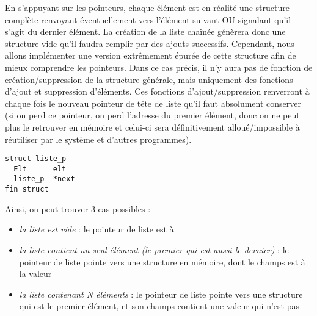 \documentclass[11pt,a4paper]{article}
\begin{document}
\medskip

En s'appuyant sur les pointeurs, chaque élément est en réalité une structure complète renvoyant éventuellement vers l'élément suivant OU signalant qu'il s'agit du dernier élément.
La création de la liste chaînée génèrera donc une structure vide qu'il faudra remplir par des ajouts successifs.
Cependant, nous allons implémenter une version extrêmement épurée de cette structure afin de mieux comprendre les pointeurs.
Dans ce cas précis, il n'y aura pas de fonction de création/suppression de la structure générale, mais uniquement des fonctions d'ajout et suppression d'éléments.
Ces fonctions d'ajout/suppression renverront à chaque fois le nouveau pointeur de tête de liste qu'il faut absolument conserver (si on perd ce pointeur, on perd l'adresse du premier élément, donc on ne peut plus le retrouver en mémoire et celui-ci sera définitivement alloué/impossible à réutiliser par le système et d'autres programmes).

\begin{center}
\begin{lstlisting}[style=algorithmique]
struct liste_p
  Elt      elt
  liste_p  *next
fin struct \end{lstlisting}
\end{center}

Ainsi, on peut trouver 3 cas possibles :
\begin{itemize}
\item \textit{la liste est vide} : le pointeur de liste est à 
\item \textit{la liste contient un seul élément (le premier qui est aussi le dernier)} : le pointeur de liste pointe vers une structure en mémoire, dont le champs  est à la valeur 
\item \textit{la liste contenant N éléments} : le pointeur de liste pointe vers une structure qui est le premier élément, et son champs  contient une valeur qui n'est pas 
\end{itemize}


\bigskip


\end{document}
